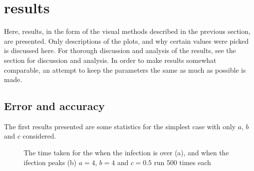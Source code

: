 \section{results}
Here, results, in the form of the visual methods described in the previous section, are presented. 
Only descriptions of the plots, and why certain values were picked is discussed here. 
For thorough discussion and analysis of the results, see the section for discussion and analysis.
In order to make results somewhat comparable, an attempt to keep the parameters the same as much as possible is made.

\subsection{Error and accuracy}
The first results presented are some statistics for the simplest case with only $a$, $b$ and $c$ considered.

\begin{figure}[H]
    \centering
    \caption{The time taken for the when the infection is over (a), and when the ifection peaks (b) $a=4$, $b=4$ and $c=0.5$ run 500 times each}
    \label{fig:error_IoverIpeak}
\end{figure}

